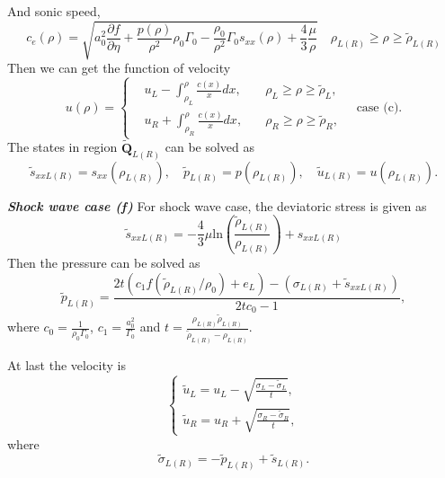 \documentclass[review]{elsarticle}
\begin{document}
\begin{enumerate}[Step 1]
And sonic speed,
\begin{equation}
  c_e(\rho) = 
	  \sqrt{a_0^2 \frac{\partial f}{\partial \eta} + \frac{p(\rho)}{\rho^2}\rho_0\Gamma_0 -\frac{\rho_0}{\rho^2}\Gamma_0 s_{xx}(\rho) +\frac{4}{3}\frac{\mu}{\rho}} \quad   \rho_{L(R)} \ge \rho \ge \tilde{\rho}_{L(R)}
\end{equation}
Then we can get  the   function of  velocity
\begin{equation}
  u(\rho) =\left\{ \begin{aligned} 
	&u_L - \int_{\rho_L}^{\rho} \frac{c(x)}{x} dx, \quad & \rho_{L} \ge \rho \ge \tilde{\rho}_{L}
 , \\
 &u_R + \int_{\rho_R}^{\rho} \frac{c(x)}{x} dx, \quad &  \rho_R\ge \rho\ge \tilde{\rho}_R , 
	\end{aligned}
  \right. \quad \text{case (c)}.
\end{equation}
The states in region $\tilde{\mathbf{Q}}_{L(R)}$ can be solved as 
\begin{equation}
  \tilde{s}_{xxL(R)} = s_{xx}(\rho_{L(R)}),\quad \tilde{p}_{L(R)} = p(\rho_{L(R)}), \quad \tilde{u}_{L(R)} = u(\rho_{L(R)}).
\end{equation}

\emph{\textbf{Shock wave case (f)}} For shock wave case, the deviatoric stress is given as 
\begin{equation}
  \tilde{ s}_{xxL(R)} =
  -\frac{4}{3}\mu\text{ln}\left(\frac{\tilde{\rho}_{L(R)}}{\rho_{L(R)}}\right)+s_{xxL(R)}
	\end{equation}
	Then the pressure can be solved as 
\begin{equation}
  \tilde{p}_{L(R)}=
  \frac{2t(c_1f(\tilde{\rho}_{L(R)}/\rho_0)+e_L)-(\sigma_{L(R)}+\tilde{s}_{xxL(R)})}{2tc_0-1},
\end{equation}
where $c_0 = \frac{1}{\rho_0\Gamma_0}$, $c_1 = \frac{a_0^2}{\Gamma_0}$ and $ t=\frac{\rho_{L(R)} \tilde{\rho}_{L(R)}}{\tilde{\rho}_{L(R)}-\rho_{L(R)}}$.

At last the velocity is
\begin{equation}
 \left\{ \begin{array}{ll}
   \tilde{u}_{L}= u_L -\sqrt{\frac{\sigma_L-\tilde{\sigma}_{L}}{t}},\\ 
	   \tilde{u}_{R} =   u_R +\sqrt{\frac{\sigma_R-\tilde{\sigma}_{R}}{t}},  
   \end{array}
 \right.
 \end{equation}
 where 
 \begin{equation}
   \tilde{\sigma}_{L(R)} = -\tilde{p}_{L(R)} + \tilde{s}_{L(R)}.
 \end{equation}



\end{enumerate}
\end{document}
